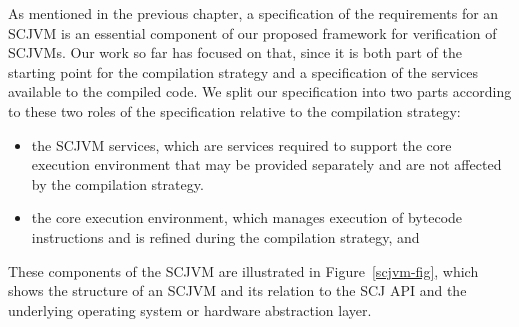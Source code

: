 \documentclass[a4paper,10pt]{report}
\begin{document}
As mentioned in the previous chapter, a specification of the
requirements for an SCJVM is an essential component of our proposed
framework for verification of SCJVMs.
Our work so far has focused on that, since it is both part of the
starting point for the compilation strategy and a specification of the
services available to the compiled code.
We split our specification into two parts according to these two roles
of the specification relative to the compilation strategy:
\begin{itemize}
\item the SCJVM services, which are services required to support the
  core execution environment that may be provided separately and are
  not affected by the compilation strategy.
\item the core execution environment, which manages execution of
  bytecode instructions and is refined during the compilation
  strategy, and
\end{itemize}
These components of the SCJVM are illustrated in
Figure~\ref{scjvm-fig}, which shows the structure of an SCJVM and its
relation to the SCJ API and the underlying operating system or
hardware abstraction layer.
\end{document}
